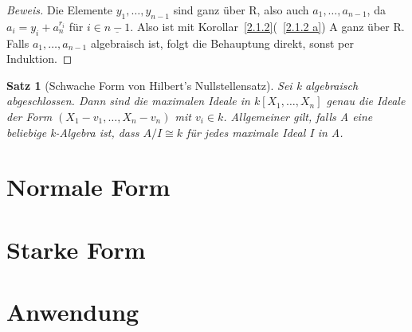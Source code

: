 \documentclass{article}
\newtheorem{satz}{Satz}
\begin{document}
\begin{proof}[Beweis]
	Die Elemente \(y_1,\ldots,y_{n-1}\) sind ganz über R, also auch \(a_1,\ldots,
	a_{n-1}\), da \(a_i = y_i + a_n^{r_i}\) für \(i \in \underline{n-1}\).
	Also ist mit Korollar~\ref{2.1.2}(~\ref{2.1.2 a}) A ganz über R. Falls
	\(a_1,\ldots,a_{n-1}\) algebraisch ist, folgt die Behauptung direkt, sonst
	per Induktion.
	\end{proof}

	\begin{satz}[Schwache Form von Hilbert's Nullstellensatz]
	Sei k algebraisch abgeschlossen. Dann sind die maximalen Ideale in
	\(k[X_1, \ldots, X_n]\) genau die Ideale der Form \((X_1-v_1,\ldots,
	X_n-v_n)\) mit \(v_i \in k\). Allgemeiner gilt, falls A eine beliebige
	k-Algebra ist, dass \(A/I \cong k\) für jedes maximale Ideal I in A.
	\end{satz}


\section{Normale Form}
\section{Starke Form}
\section{Anwendung}
\end{document}
